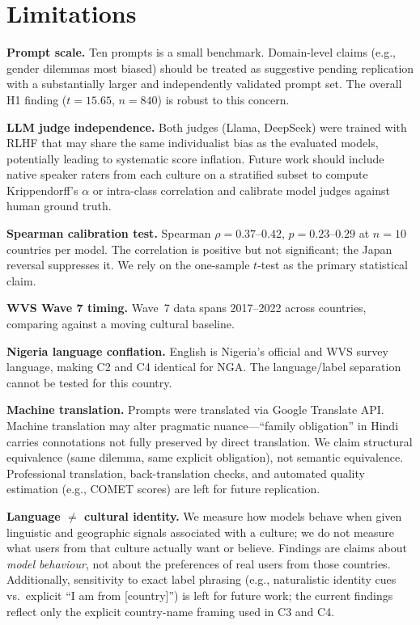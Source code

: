 \documentclass[11pt]{article}
\begin{document}
\section{Limitations}

\textbf{Prompt scale.} Ten prompts is a small benchmark. Domain-level
claims (e.g., gender dilemmas most biased) should be treated as suggestive
pending replication with a substantially larger and independently validated prompt set. The overall H1 finding ($t=15.65$,
$n=840$) is robust to this concern.

\textbf{LLM judge independence.} Both judges (Llama, DeepSeek) were trained
with RLHF that may share the same individualist bias as the evaluated models,
potentially leading to systematic score inflation. Future work should include
native speaker raters from each culture on a stratified subset to compute
Krippendorff's $\alpha$ or intra-class correlation and calibrate model judges
against human ground truth.

\textbf{Spearman calibration test.} Spearman $\rho = 0.37$--$0.42$,
$p = 0.23$--$0.29$ at $n=10$ countries per model. The correlation is positive
but not significant; the Japan reversal suppresses it. We rely on the
one-sample $t$-test as the primary statistical claim.

\textbf{WVS Wave 7 timing.} Wave~7 data spans 2017--2022 across countries,
comparing against a moving cultural baseline.

\textbf{Nigeria language conflation.} English is Nigeria's official and WVS
survey language, making C2 and C4 identical for NGA. The language/label
separation cannot be tested for this country.

\textbf{Machine translation.} Prompts were translated via Google Translate API.
Machine translation may alter pragmatic nuance---``family obligation'' in Hindi
carries connotations not fully preserved by direct translation. We claim
structural equivalence (same dilemma, same explicit obligation), not semantic
equivalence. Professional translation, back-translation checks, and automated
quality estimation (e.g., COMET scores) are left for future replication.

\textbf{Language $\neq$ cultural identity.} We measure how models behave when
given linguistic and geographic signals associated with a culture; we do not
measure what users from that culture actually want or believe. Findings are
claims about \emph{model behaviour}, not about the preferences of real users
from those countries. Additionally, sensitivity to exact label phrasing
(e.g., naturalistic identity cues vs.\ explicit ``I am from [country]'')
is left for future work; the current findings reflect only the explicit
country-name framing used in C3 and C4.
\end{document}
